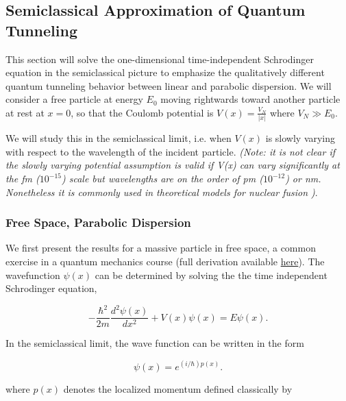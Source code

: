 \documentclass[onecolumn,
               superscriptaddress,
               floatfix,
               longbibliography, 
               showkeys,apl]{revtex4-2}
\begin{document}
\begin{appendices}
\section{Semiclassical Approximation of Quantum Tunneling}\label{sec:semiclassicalapproximation}

This section will solve the one-dimensional time-independent Schrodinger equation in the semiclassical picture to emphasize the qualitatively different quantum tunneling behavior between linear and parabolic dispersion. We will consider a free particle at energy $E_0$ moving rightwards toward another particle at rest at $x=0$, so that the Coulomb potential is $V(x)=\frac{V_N}{|x|}$ where $V_N \gg E_0$.

We will study this in the semiclassical limit, i.e. when $V(x)$ is slowly varying with respect to the wavelength of the incident particle. \textit{(Note: it is not clear if the slowly varying potential assumption is valid if V(x) can vary significantly at the fm ($10^{-15}$) scale but wavelengths are on the order of pm ($10^{-12}$) or nm. Nonetheless it is commonly used in theoretical models for nuclear fusion \cite{PhysRevC.110.034614,Liu_2021,PhysRevC.105.054001})}. 

\subsubsection{Free Space, Parabolic Dispersion}

We first present the results for a massive particle in free space, a common exercise in a quantum mechanics course \cite{FowlerQuantumMechanics} (full derivation available \href{https://phys.libretexts.org/Bookshelves/Quantum_Mechanics/Quantum_Mechanics_(Fowler)/08%3A_Approximate_Methods/8.02%3A_The_WKB_Approximation}{here}). The wavefunction $\psi(x)$ can be determined by solving the the time independent Schrodinger equation,

\begin{equation}
    -\frac{\hbar^2}{2m} \frac{d^2\psi(x)}{dx^2} + V(x)\psi(x) = E\psi(x).
\end{equation}

In the semiclassical limit, the wave function can be written in the form

\begin{equation}
    \psi(x) = e^{(i/\hbar)p(x)}.
\end{equation}

where $p(x)$ denotes the localized momentum defined classically by 


\end{appendices}
\end{document}
